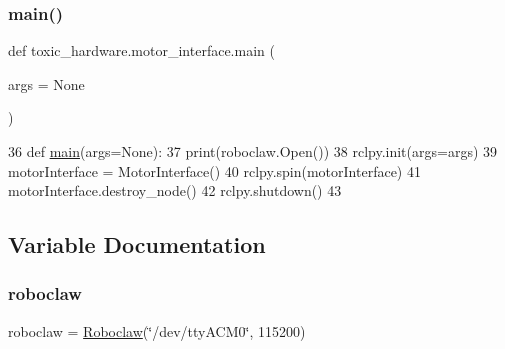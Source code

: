 \subsubsection{\texorpdfstring{main()}{main()}}
{\footnotesize\ttfamily def toxic\+\_\+hardware.\+motor\+\_\+interface.\+main (\begin{DoxyParamCaption}\item[{}]{args = {\ttfamily None} }\end{DoxyParamCaption})}


\begin{DoxyCode}
36 \textcolor{keyword}{def }\mbox{\hyperlink{namespacetoxic__hardware_1_1motor__interface_a2a214c16e0dd6e2551c72185d306001e}{main}}(args=None):
37     print(roboclaw.Open())
38     rclpy.init(args=args)
39     motorInterface = MotorInterface()
40     rclpy.spin(motorInterface)
41     motorInterface.destroy\_node()
42     rclpy.shutdown()
43 
\end{DoxyCode}


\subsection{Variable Documentation}
\mbox{\label{namespacetoxic__hardware_1_1motor__interface_a257386444c3afd4030922ffb828f85fe}} 
\subsubsection{\texorpdfstring{roboclaw}{roboclaw}}
{\footnotesize\ttfamily roboclaw = \mbox{\hyperlink{classtoxic__hardware_1_1roboclaw__3_1_1Roboclaw}{Roboclaw}}(\char`\"{}/dev/tty\+A\+C\+M0\char`\"{}, 115200)}

